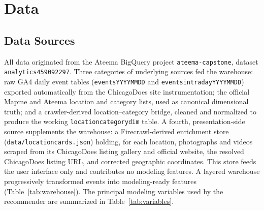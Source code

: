 \documentclass[12pt,letterpaper]{article}
\newcommand{\codeunderscore}{\discretionary{\textunderscore}{}{\textunderscore}}
\newcommand{\code}[1]{\begingroup\let\_\codeunderscore\texttt{\small #1}\endgroup}
\begin{document}
\section{Data}\label{sec:data-section}

\subsection{Data Sources}\label{sec:data-sources}

All data originated from the Ateema BigQuery project
\code{ateema-capstone}, dataset \code{analytics\_459092297}. Three
categories of underlying sources fed the warehouse: raw GA4 daily
event tables (\code{events\_YYYYMMDD} and
\code{events\_intraday\_YYYYMMDD}) exported automatically from the
ChicagoDoes site instrumentation; the official Mapme and Ateema
location and category lists, used as canonical dimensional truth; and
a crawler-derived location--category bridge, cleaned and normalized to
produce the working \code{location\_category\_dim} table. A fourth,
presentation-side source supplements the warehouse: a
Firecrawl-derived enrichment store (\code{data/location\_cards.json})
holding, for each location, photographs and videos scraped from its
ChicagoDoes listing gallery and official website, the resolved
ChicagoDoes listing URL, and corrected geographic coordinates. This
store feeds the user interface only and contributes no modeling
features. A layered
warehouse progressively transformed events into modeling-ready
features (Table~\ref{tab:warehouse}). The principal modeling variables
used by the recommender are summarized in Table~\ref{tab:variables}.
\end{document}
